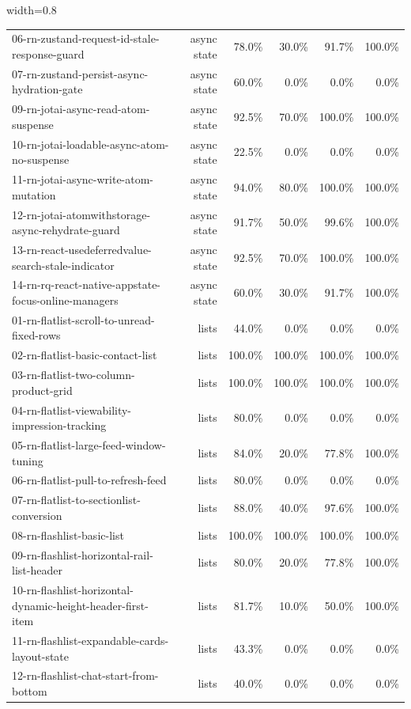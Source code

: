 \begin{table}[htbp]
\begin{adjustbox}{width=0.8\textwidth}
\begin{tabular}{lrrrrr}
06-rn-zustand-request-id-stale-response-guard & async state & 78.0\% & 30.0\% & 91.7\% & 100.0\% \\
07-rn-zustand-persist-async-hydration-gate & async state & 60.0\% & 0.0\% & 0.0\% & 0.0\% \\
09-rn-jotai-async-read-atom-suspense & async state & 92.5\% & 70.0\% & 100.0\% & 100.0\% \\
10-rn-jotai-loadable-async-atom-no-suspense & async state & 22.5\% & 0.0\% & 0.0\% & 0.0\% \\
11-rn-jotai-async-write-atom-mutation & async state & 94.0\% & 80.0\% & 100.0\% & 100.0\% \\
12-rn-jotai-atomwithstorage-async-rehydrate-guard & async state & 91.7\% & 50.0\% & 99.6\% & 100.0\% \\
13-rn-react-usedeferredvalue-search-stale-indicator & async state & 92.5\% & 70.0\% & 100.0\% & 100.0\% \\
14-rn-rq-react-native-appstate-focus-online-managers & async state & 60.0\% & 30.0\% & 91.7\% & 100.0\% \\
01-rn-flatlist-scroll-to-unread-fixed-rows & lists & 44.0\% & 0.0\% & 0.0\% & 0.0\% \\
02-rn-flatlist-basic-contact-list & lists & 100.0\% & 100.0\% & 100.0\% & 100.0\% \\
03-rn-flatlist-two-column-product-grid & lists & 100.0\% & 100.0\% & 100.0\% & 100.0\% \\
04-rn-flatlist-viewability-impression-tracking & lists & 80.0\% & 0.0\% & 0.0\% & 0.0\% \\
05-rn-flatlist-large-feed-window-tuning & lists & 84.0\% & 20.0\% & 77.8\% & 100.0\% \\
06-rn-flatlist-pull-to-refresh-feed & lists & 80.0\% & 0.0\% & 0.0\% & 0.0\% \\
07-rn-flatlist-to-sectionlist-conversion & lists & 88.0\% & 40.0\% & 97.6\% & 100.0\% \\
08-rn-flashlist-basic-list & lists & 100.0\% & 100.0\% & 100.0\% & 100.0\% \\
09-rn-flashlist-horizontal-rail-list-header & lists & 80.0\% & 20.0\% & 77.8\% & 100.0\% \\
10-rn-flashlist-horizontal-dynamic-height-header-first-item & lists & 81.7\% & 10.0\% & 50.0\% & 100.0\% \\
11-rn-flashlist-expandable-cards-layout-state & lists & 43.3\% & 0.0\% & 0.0\% & 0.0\% \\
12-rn-flashlist-chat-start-from-bottom & lists & 40.0\% & 0.0\% & 0.0\% & 0.0\% \\

\end{tabular}
\end{adjustbox}
\end{table}
